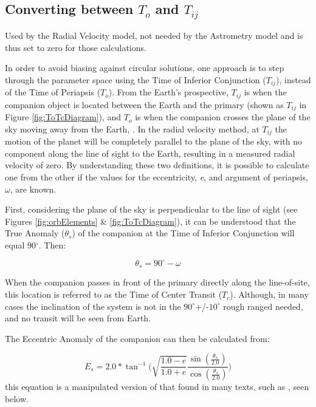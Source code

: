 \documentclass[12pt,preprint]{aastex}
\begin{document}
\subsection{Converting between $T_o$ and $T_{ij}$}\label{sec:ToTcCalculator}

Used by the Radial Velocity model, not needed by the Astrometry model and is thus set to zero for those calculations.

In order to avoid biasing against circular solutions, one approach is to step through the parameter space using the Time of Inferior Conjunction ($T_{ij}$), instead of the Time of Periapsis ($T_o$).  From the Earth's prospective, $T_{ij}$ is when the companion object is located between the Earth and the primary (shown as {\color{green}$T_{ij}$} in Figure \ref{fig:ToTcDiagram}), and $T_o$ is when the companion crosses the plane of the sky moving away from the Earth, \citep{heintz}.  In the radial velocity method, at $T_{ij}$ the motion of the planet will be completely parallel to the plane of the sky, with no component along the line of sight to the Earth, resulting in a measured radial velocity of zero.  By understanding these two definitions, it is possible to calculate one from the other if the values for the eccentricity, {\it e}, and argument of periapsis, $\omega$, are known.

First, considering the plane of the sky is perpendicular to the line of sight (see Figures \ref{fig:orbElements} \& \ref{fig:ToTcDiagram}), it can be understood that the True Anomaly ($\theta_s$) of the companion at the Time of Inferior Conjunction will equal 90$^{\circ}$.  Then:

\begin{equation}\label{eq:one}
\theta_s = 90^{\circ}-\omega
\end{equation}

When the companion passes in front of the primary directly along the line-of-site, this location is referred to as the Time of Center Transit ($T_c$).  Although, in many cases the inclination of the system is not in the $90^{\circ}$+/-$10^{\circ}$ rough ranged needed, and no transit will be seen from Earth.

The Eccentric Anomaly of the companion can then be calculated from:

\begin{equation}
E_s = 2.0*\tan^{-1} \bigg( \sqrt{\frac{1.0-e}{1.0+e}} \frac{\sin(\frac{\theta_s}{2.0})}{\cos(\frac{\theta_s}{2.0})} \bigg)
\end{equation}
this equation is a manipulated version of that found in many texts, such as \citet{heintz}, seen below.
\end{document}
